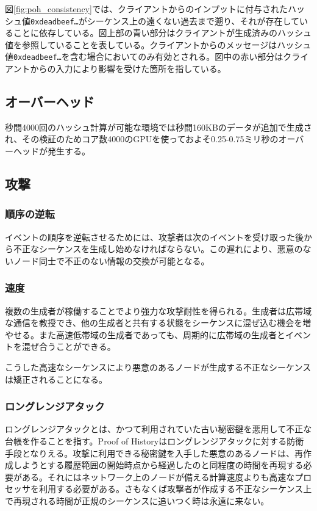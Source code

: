 \documentclass[12pt]{ltjsarticle}
\begin{document}
図\ref{fig:poh_consistency}では、クライアントからのインプットに付与されたハッシュ値\texttt{0xdeadbeef\ldots}がシーケンス上の遠くない過去まで遡り、それが存在していることに依存している。図上部の青い部分はクライアントが生成済みのハッシュ値を参照していることを表している。クライアントからのメッセージはハッシュ値\texttt{0xdeadbeef\ldots}を含む場合においてのみ有効とされる。図中の赤い部分はクライアントからの入力により影響を受けた箇所を指している。

\subsection{オーバーヘッド}
秒間4000回のハッシュ計算が可能な環境では秒間160KBのデータが追加で生成され、その検証のためコア数4000のGPUを使っておよそ0.25-0.75ミリ秒のオーバーヘッドが発生する。

\subsection{攻撃}
\subsubsection{順序の逆転}
 イベントの順序を逆転させるためには、攻撃者は次のイベントを受け取った後から不正なシーケンスを生成し始めなければならない。この遅れにより、悪意のないノード同士で不正のない情報の交換が可能となる。

\subsubsection{速度}
複数の生成者が稼働することでより強力な攻撃耐性を得られる。生成者は広帯域な通信を教授でき、他の生成者と共有する状態をシーケンスに混ぜ込む機会を増やせる。また高速低帯域の生成者であっても、周期的に広帯域の生成者とイベントを混ぜ合うことができる。

こうした高速なシーケンスにより悪意のあるノードが生成する不正なシーケンスは矯正されることになる。

\subsubsection{ロングレンジアタック}

ロングレンジアタックとは、かつて利用されていた古い秘密鍵を悪用して不正な台帳を作ることを指す\cite{casper}。Proof of Historyはロングレンジアタックに対する防衛手段となりえる。攻撃に利用できる秘密鍵を入手した悪意のあるノードは、再作成しようとする履歴範囲の開始時点から経過したのと同程度の時間を再現する必要がある。それにはネットワーク上のノードが備える計算速度よりも高速なプロセッサを利用する必要がある。さもなくば攻撃者が作成する不正なシーケンス上で再現される時間が正規のシーケンスに追いつく時は永遠に来ない。
\end{document}
